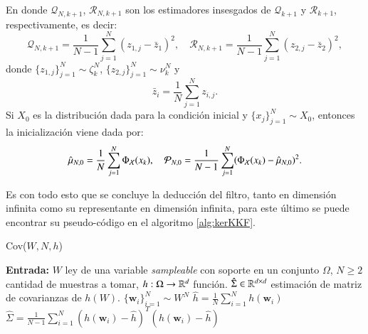 En donde $\mathcal{Q}_{N,k+1}$, $\mathcal{R}_{N,k+1}$ son los estimadores insesgados de $\mathcal{Q}_{k+1}$ y $\mathcal{R}_{k+1}$, respectivamente, es decir:
\begin{equation}
	\mathcal{Q}_{N,k+1} = \frac{1}{N-1}\sum_{j=1}^N (z_{1,j} - \bar{z}_1)^2, \quad \mathcal{R}_{N,k+1} = \frac{1}{N-1}\sum_{j=1}^N (z_{2,j} - \bar{z}_2)^2,
	\label{eq: emp_covars}
\end{equation}
donde $\{ z_{1,j} \}_{j=1}^N \sim \zeta_k^N$, $\{ z_{2,j} \}_{j=1}^N \sim \nu_k^N$ y 
\begin{equation*}
	\bar{z}_i = \frac{1}{N} \sum_{j=1}^N z_{i,j}.
\end{equation*}
Si $X_0$ es la distribución dada para la condición inicial y $\{ x_j \}_{j=1}^N \sim X_0$, entonces la inicialización viene dada por:
\begin{equation}
	\hat{\mu}_{N,0} = \frac{1}{N} \sum_{j=1}^N \Phi_{\mathcal{X}}(x_{k}), \quad \mathcal{P}_{N,0} = \frac{1}{N-1} \sum_{j=1}^N (\Phi_{\mathcal{X}}(x_{k}) - \hat{\mu}_{N,0})^2.
	\label{eq: mean_element_covar}
\end{equation}

Es con todo esto que se concluye la deducción del filtro, tanto en dimensión infinita como su representante en dimensión infinita, para este último se puede encontrar su pseudo-código en el algoritmo \ref{alg:kerKKF}.

\begin{algorithm}[h]
\caption{Cov($W, N, h$)}\label{alg:AppCov}
\begin{algorithmic}[1]
\State \textbf{Entrada:} $W$ ley de una variable \textit{sampleable} con soporte en un conjunto $\Omega$, $N \geq 2$ cantidad de muestras a tomar, $h:\Omega \to \mathbb{R}^d$ función.
\Ensure $\hat{\Sigma} \in \mathbb{R}^{d \times d}$ estimación de matriz de covarianzas de $h(W)$.
\State $\{ \mathbf{w}_i \}_{i=1}^N \sim W^N$  
\State $\hat{h} = \frac{1}{N} \sum_{i=1}^N h (\mathbf{w}_i)$ 
\State $\hat{\Sigma} = \frac{1}{N-1} \sum_{i=1}^N (h (\mathbf{w}_i) - \hat{h})^T(h (\mathbf{w}_i) - \hat{h})$  
\end{algorithmic}
\end{algorithm}

